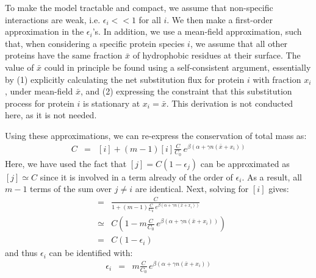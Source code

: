 \documentclass{article}
\begin{document}
To make the model tractable and compact, we assume that non-specific interactions are weak, i.e. $\epsilon_i << 1$ for all $i$. We then make a first-order approximation in the $\epsilon_i$'s. In addition, we use a mean-field approximation, such that, when considering a specific protein species $i$, we assume that all other proteins have the same fraction $\bar x$ of hydrophobic residues at their surface. The value of $\bar x$ could in principle be found using a self-consistent argument, essentially by (1) explicitly calculating the net substitution flux for protein $i$ with fraction $x_i$, under mean-field $\bar x$, and (2) expressing the constraint that this substitution process for protein $i$ is stationary at $x_i = \bar x$. This derivation is not conducted here, as it is not needed.

Using these approximations, we can re-express the conservation of total mass as:
\begin{eqnarray}
C &=& [i] + (m-1) [i] \frac{C}{C_0} \, e^{\beta (\alpha + \gamma n (\bar x + x_i))}
\end{eqnarray}
Here, we have used the fact that $[j] = C(1 - \epsilon_j)$ can be approximated as $[j] \simeq C$ since it is involved in a term already of the order of $\epsilon_i$. As a result, all $m-1$ terms of the sum over $j\neq i$ are identical.
Next, solving for $[i]$ gives:
\begin{eqnarray}
[i] &=& \frac{C} {1 + (m-1) \frac{C}{C_0} \, e^{\beta (\alpha + \gamma n (\bar x + x_i))}}
\\ &\simeq& C \left( 1 - m \frac{C}{C_0} \, e^{\beta (\alpha + \gamma n (\bar x + x_i))} \right)
\\ &=&
C (1 - \epsilon_i)
\end{eqnarray}
and thus $\epsilon_i$ can be identified with:
\begin{eqnarray}
\epsilon_i  &=& m \frac{C}{C_0} \, e^{\beta (\alpha +\gamma n (\bar x + x_i))}
\end{eqnarray}
\end{document}
